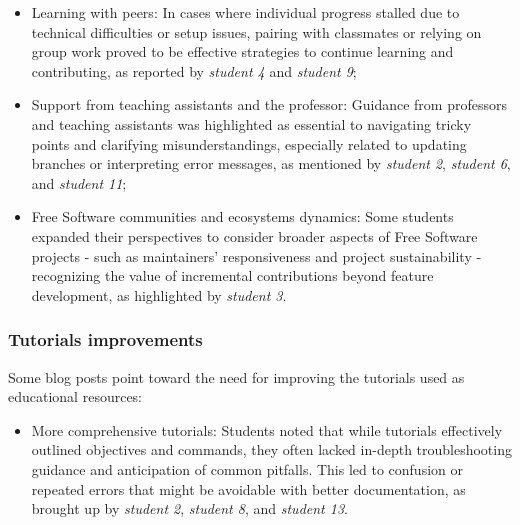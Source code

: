 \begin{itemize}
    \item Learning with peers: In cases where individual progress stalled due to
    technical difficulties or setup issues, pairing with classmates or relying
    on group work proved to be effective strategies to continue learning and
    contributing, as reported by \textit{student 4} and \textit{student 9};
    \item Support from teaching assistants and the professor: Guidance from
    professors and teaching assistants was highlighted as essential to
    navigating tricky points and clarifying misunderstandings, especially
    related to updating branches or interpreting error messages, as mentioned by
    \textit{student 2}, \textit{student 6}, and \textit{student 11};
    \item Free Software communities and ecosystems dynamics: Some students
    expanded their perspectives to consider broader aspects of Free Software
    projects - such as maintainers' responsiveness and project sustainability -
    recognizing the value of incremental contributions beyond feature
    development, as highlighted by \textit{student 3}.
\end{itemize}

\subsubsection{Tutorials improvements}

Some blog posts point toward the need for improving the tutorials used as
educational resources:

\begin{itemize}
    \item More comprehensive tutorials: Students noted that while tutorials
    effectively outlined objectives and commands, they often lacked in-depth
    troubleshooting guidance and anticipation of common pitfalls. This led to
    confusion or repeated errors that might be avoidable with better
    documentation, as brought up by \textit{student 2}, \textit{student 8}, and
    \textit{student 13}.
\end{itemize}
